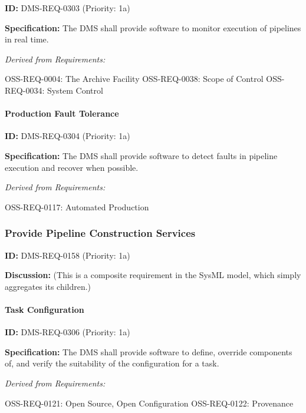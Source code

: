 \documentclass[SE,toc,lsstdraft]{lsstdoc}
\begin{document}
\label{DMS-REQ-0303}
\textbf{ID:} DMS-REQ-0303 (Priority: 1a)

\textbf{Specification:} The DMS shall provide software to monitor execution of pipelines in real time.

\emph{Derived from Requirements:}

OSS-REQ-0004:
The Archive Facility \newline
OSS-REQ-0038:
Scope of Control \newline
OSS-REQ-0034:
System Control \newline

\paragraph{Production Fault Tolerance}\hfill  %

\label{DMS-REQ-0304}
\textbf{ID:} DMS-REQ-0304 (Priority: 1a)

\textbf{Specification:} The DMS shall provide software to detect faults in pipeline execution and recover when possible.

\emph{Derived from Requirements:}

OSS-REQ-0117:
Automated Production \newline

\subsubsection{Provide Pipeline Construction Services}

\label{DMS-REQ-0158}
\textbf{ID:} DMS-REQ-0158 (Priority: 1a)

\textbf{Discussion:}
    (This is a composite requirement in the SysML model, which simply aggregates its children.)

\paragraph{Task Configuration}\hfill  %

\label{DMS-REQ-0306}
\textbf{ID:} DMS-REQ-0306 (Priority: 1a)

\textbf{Specification:} The DMS shall provide software to define, override components of, and verify the suitability of the configuration for a task.

\emph{Derived from Requirements:}

OSS-REQ-0121:
Open Source, Open Configuration \newline
OSS-REQ-0122:
Provenance \newline
\end{document}
